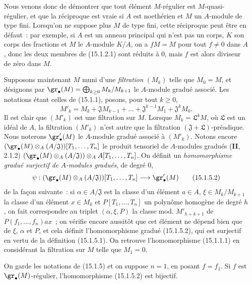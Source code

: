 Nous venons donc de démontrer que tout élément $M$-régulier est
$M$-quasi-régulier, et que la réciproque est vraie si $A$ est noethérien et
$M$ un $A$-module de type fini. Lorsqu'on ne suppose plus $M$ de type fini,
cette réciproque peut être en défaut~: par exemple, si $A$ est un anneau
principal qui n'est pas un corps, $K$ son corps des fractions et $M$ le
$A$-module $K/A$, on a $fM=M$ pour tout $f\neq0$ dans $A$, donc les deux
membres de (15.1.2.1) sont réduits à $0$, mais $f$ est alors diviseur de zéro
dans $M$.

\begin{env}[15.1.5]
\label{0.15.1.5-fr}
Supposons maintenant $M$ muni d'une \emph{filtration} $(M_k)$ telle que
$M_0=M$, et désignons par
$\gr_\bullet(M)=\bigoplus_{k\geq0}M_k/M_{k+1}$ le $A$-module gradué associé.
Les notations étant celles de (15.1.1), posons, pour tout $k\geq0$,
\[
  M'_k=M_k+\mathfrak{J}M_{k-1}+\ldots+
  \mathfrak{J}^{k-1}M_1+\mathfrak{J}^kM_0.
  \tag{15.1.5.1}\label{0.15.1.5.1-fr}
\]
Il est clair que $(M'_k)$ est une filtration sur $M$. Lorsque
$M_k=\mathfrak{L}^kM$, où $\mathfrak L$ est un idéal de $A$, la filtration
$(M'_k)$ n'est autre que la filtration
$(\mathfrak{J}+\mathfrak{L})$-préadique. Nous noterons
$\gr'_\bullet(M)$ le $A$-module gradué associé à $(M'_k)$. Notons encore
$(\gr_\bullet(M)\otimes_A(A/\mathfrak{J}))[T_1,\ldots,T_n]$
le produit tensoriel de $A$-modules gradués (\textbf{II}, 2.1.2)
$(\gr_\bullet(M)\otimes_A(A/\mathfrak{J}))\otimes_A A[T_1,\ldots,T_n]$.
On définit un \emph{homomorphisme gradué surjectif de $A$-modules gradués}, de
degré $0$,
\[
  \psi:(\gr_\bullet(M)\otimes_A(A/\mathfrak{J}))[T_1,\ldots,T_n]
  \longrightarrow\gr'_\bullet(M)
  \tag{15.1.5.2}\label{0.15.1.5.2-fr}
\]
de la façon suivante~: si $\alpha\in A/\mathfrak{J}$ est la classe d'un
élément $a\in A$, $\xi\in M_k/M_{k+1}$ la classe d'un élément $x\in M_k$ et
$P[T_1,\ldots,T_n]$ un polynôme homogène de degré $h$, on fait correspondre au
triplet $(\alpha,\xi,P)$ la classe mod. $M'_{h+k+1}$ de
$P(f_1,\ldots,f_n)ax$~; on vérifie encore aussitôt que cet élément ne dépend
bien que de $\xi$, $\alpha$ et $P$, et cela définit l'homomorphisme gradué
(15.1.5.2), qui est surjectif en vertu de la définition (15.1.5.1). On
retrouve l'homomorphisme (15.1.1.1) en considérant la filtration sur $M$ telle
que $M_1=0$.
\end{env}

\begin{lemma}[15.1.6]
\label{0.15.1.6-fr}
On garde les notations de (15.1.5) et on suppose $n=1$, en posant $f=f_1$. Si
$f$ est $\gr_\bullet(M)$-régulier, l'homomorphisme (15.1.5.2) est bijectif.
\end{lemma}


